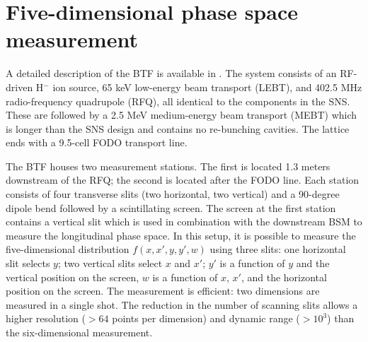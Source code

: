 \documentclass[%
 reprint,
 amsmath,amssymb,
 aps,
prstab,
]{revtex4-2}
\begin{document}
\section{Five-dimensional phase space measurement}\label{sec:five-dimensional-phase-space-measurement}

A detailed description of the BTF is available in \cite{Zhang2020}. The system consists of an RF-driven H$^-$ ion source, 65 keV low-energy beam transport (LEBT), and 402.5 MHz radio-frequency quadrupole (RFQ), all identical to the components in the SNS. These are followed by a 2.5 MeV medium-energy beam transport (MEBT) which is longer than the SNS design and contains no re-bunching cavities. The lattice ends with a 9.5-cell FODO transport line.

The BTF houses two measurement stations. The first is located 1.3 meters downstream of the RFQ; the second is located after the FODO line. Each station consists of four transverse slits (two horizontal, two vertical) and a 90-degree dipole bend followed by a scintillating screen. The screen at the first station contains a vertical slit which is used in combination with the downstream BSM to measure the longitudinal phase space. In this setup, it is possible to measure the five-dimensional distribution $f(x, x', y, y', w)$ using three slits: one horizontal slit selects $y$; two vertical slits select $x$ and $x'$; $y'$ is a function of $y$ and the vertical position on the screen, $w$ is a function of $x$, $x'$, and the horizontal position on the screen. The measurement is efficient: two dimensions are measured in a single shot. The reduction in the number of scanning slits allows a higher resolution ($>64$ points per dimension) and dynamic range ($>10^3$) than the six-dimensional measurement.
\end{document}

